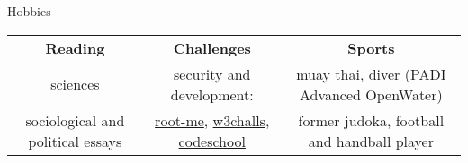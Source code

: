 \begin{rSection}{Hobbies}

  \begin{center}
      \begin{tabular}
          {c | c | c}
          \textbf{Reading} & \textbf{Challenges} & \textbf{Sports} \\
          sciences & security and development: &  muay thai, diver (PADI Advanced OpenWater) \\
          sociological and political essays  & \href{http://www.root-me.org/Pamplemouss_?inc=score&lang=en}{root-me}, \href{https://w3challs.com/profile/Pamplemouss_}{w3challs}, \href{https://www.codeschool.com/users/Pamplemouss_}{codeschool} & former judoka, football and handball player \\
      \end{tabular}
  \end{center}

\end{rSection}
